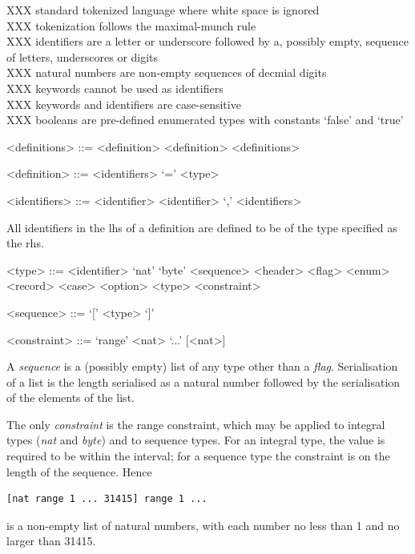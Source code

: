 \documentclass[a4paper,oneside,article]{memoir}
\begin{document}
XXX standard tokenized language where white space is ignored\\
XXX tokenization follows the maximal-munch rule\\
XXX identifiers are a letter or underscore followed by a, possibly empty, sequence of letters, underscores or digits\\
XXX natural numbers are non-empty sequences of decmial digits\\
XXX keywords cannot be used as identifiers\\
XXX keywords and identifiers are case-sensitive\\
XXX booleans are pre-defined enumerated types with constants `false' and `true'

\begin{grammar}
  <definitions> ::= <definition> \alt <definition> <definitions>
  
  <definition> ::= <identifiers> `=' <type>

  <identifiers> ::= <identifier> \alt <identifier> `,' <identifiers>
\end{grammar}

All identifiers in the lhs of a definition are defined to be of the type specified as the rhs.

\begin{grammar}
  <type> ::= <identifier> \alt `nat' \alt `byte' \alt <sequence> \alt <header> \alt <flag> \alt <enum> \alt <record> \alt <case> \alt <option> \alt <type> <constraint>

  <sequence> ::= `[' <type> `]'

  <constraint> ::= `range' <nat> `...' [<nat>]
\end{grammar}

A \emph{sequence} is a (possibly empty) list of any type other than a \emph{flag}. Serialisation of
a list is the length serialised as a natural number followed by the serialisation of the elements of
the list.

The only \emph{constraint} is the range constraint, which may be applied to integral types
(\emph{nat} and \emph{byte}) and to sequence types.  For an integral type, the value is required to
be within the interval; for a sequence type the constraint is on the length of the sequence. Hence 
\begin{verbatim}
[nat range 1 ... 31415] range 1 ...
\end{verbatim}
is a non-empty list of natural numbers, with each number no less than 1 and no larger than 31415.
\end{document}

